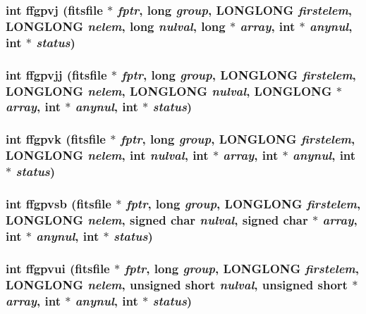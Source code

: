 \subsubsection{\setlength{\rightskip}{0pt plus 5cm}int ffgpvj (\bf{fitsfile} $\ast$ {\em fptr}, long {\em group}, \bf{LONGLONG} {\em firstelem}, \bf{LONGLONG} {\em nelem}, long {\em nulval}, long $\ast$ {\em array}, int $\ast$ {\em anynul}, int $\ast$ {\em status})}\label{src_2fitsio_8h_5b4c250bd7e498f28600d4850216cb56}


\subsubsection{\setlength{\rightskip}{0pt plus 5cm}int ffgpvjj (\bf{fitsfile} $\ast$ {\em fptr}, long {\em group}, \bf{LONGLONG} {\em firstelem}, \bf{LONGLONG} {\em nelem}, \bf{LONGLONG} {\em nulval}, \bf{LONGLONG} $\ast$ {\em array}, int $\ast$ {\em anynul}, int $\ast$ {\em status})}\label{src_2fitsio_8h_139575618933a88582c86f742063f0c4}


\subsubsection{\setlength{\rightskip}{0pt plus 5cm}int ffgpvk (\bf{fitsfile} $\ast$ {\em fptr}, long {\em group}, \bf{LONGLONG} {\em firstelem}, \bf{LONGLONG} {\em nelem}, int {\em nulval}, int $\ast$ {\em array}, int $\ast$ {\em anynul}, int $\ast$ {\em status})}\label{src_2fitsio_8h_0cbefb3447c77eb4e19523c9c0f36464}


\subsubsection{\setlength{\rightskip}{0pt plus 5cm}int ffgpvsb (\bf{fitsfile} $\ast$ {\em fptr}, long {\em group}, \bf{LONGLONG} {\em firstelem}, \bf{LONGLONG} {\em nelem}, signed char {\em nulval}, signed char $\ast$ {\em array}, int $\ast$ {\em anynul}, int $\ast$ {\em status})}\label{src_2fitsio_8h_c16f3f63bcf3165ea08e680e0cf19f3a}


\subsubsection{\setlength{\rightskip}{0pt plus 5cm}int ffgpvui (\bf{fitsfile} $\ast$ {\em fptr}, long {\em group}, \bf{LONGLONG} {\em firstelem}, \bf{LONGLONG} {\em nelem}, unsigned short {\em nulval}, unsigned short $\ast$ {\em array}, int $\ast$ {\em anynul}, int $\ast$ {\em status})}\label{src_2fitsio_8h_6f7dc3a158e748e6a3d31615a8ba9816}


